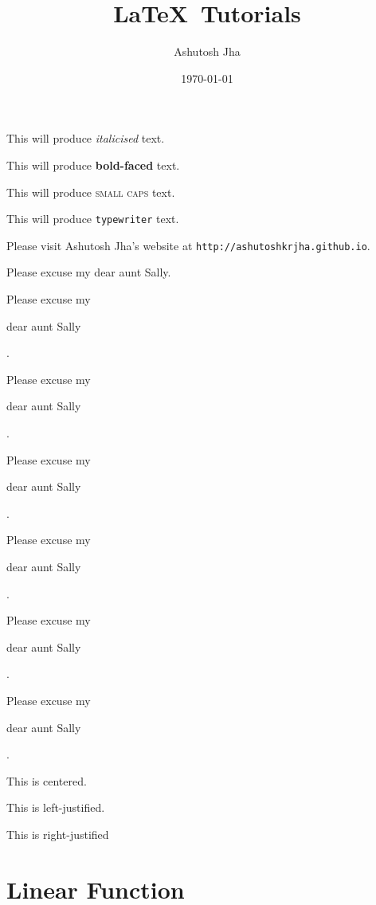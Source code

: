 \documentclass[11pt]{article}
\begin{document}
\tableofcontents

\title{\LaTeX \ Tutorials}
\author{Ashutosh Jha}
\date{\today}
\maketitle

This will produce \textit{italicised} text.

This will produce \textbf{bold-faced} text.

This will produce \textsc{small caps} text.

This will produce \texttt{typewriter} text.

Please visit Ashutosh Jha's website at
\texttt{http://ashutoshkrjha.github.io}.

Please excuse my dear aunt Sally.

Please excuse my \begin{large}dear aunt Sally\end{large}.

Please excuse my \begin{Large}dear aunt Sally\end{Large}.

Please excuse my \begin{huge}dear aunt Sally\end{huge}.

Please excuse my \begin{Huge}dear aunt Sally\end{Huge}.

Please excuse my \begin{small}dear aunt Sally\end{small}.

Please excuse my \begin{tiny}dear aunt Sally\end{tiny}.

\begin{center}This is centered.\end{center}

\begin{flushleft}This is left-justified.\end{flushleft}

\begin{flushright}This is right-justified\end{flushright}

\section{Linear Function}
\end{document}
